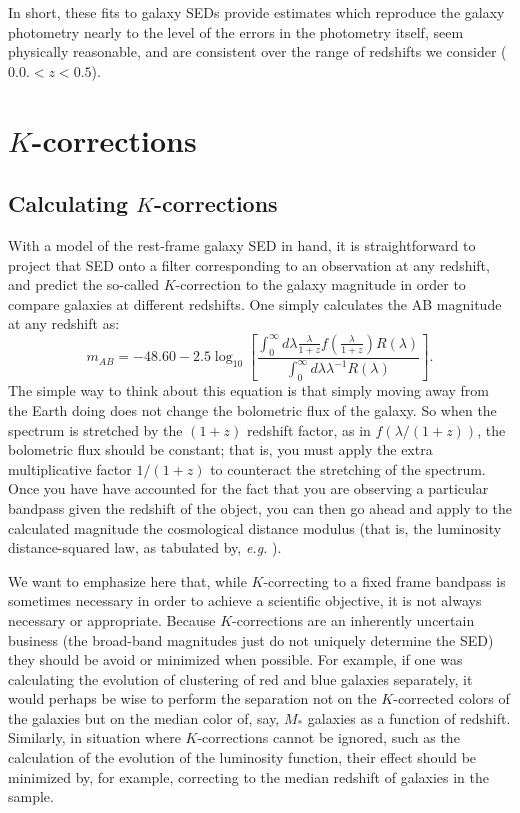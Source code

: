 \documentclass[10pt,preprint]{aastex}
\begin{document}
In short, these fits to galaxy SEDs provide estimates which reproduce
the galaxy photometry nearly to the level of the errors in the
photometry itself, seem physically reasonable, and are consistent over
the range of redshifts we consider ($0.0. < z < 0.5$).

\section{$K$-corrections}
\label{kcorrection}

\subsection{Calculating $K$-corrections}

With a model of the rest-frame galaxy SED in hand, it is 
straightforward to project that SED onto a filter corresponding to 
an observation at any redshift, and predict the so-called
$K$-correction to the galaxy magnitude in order to compare galaxies 
at different redshifts. One simply calculates the AB magnitude at 
any redshift as:
\begin{equation}
m_{AB} = -48.60 - 2.5 \log_{10}\left[
\frac{\int_{0}^{\infty} d\lambda \frac{\lambda}{1+z}
f(\frac{\lambda}{1+z}) R(\lambda)}
{\int_{0}^{\infty} d\lambda \lambda^{-1} R(\lambda)}\right].
\end{equation}
The simple way to think about this equation is that simply moving away
from the Earth doing does not change the bolometric flux of the
galaxy. So when the spectrum is stretched by the $(1+z)$ redshift
factor, as in $f(\lambda/(1+z))$, the bolometric flux should be
constant; that is, you must apply the extra multiplicative factor
$1/(1+z)$ to counteract the stretching of the spectrum. Once you have
have accounted for the fact that you are observing a particular
bandpass given the redshift of the object, you can then go ahead and
apply to the calculated magnitude the cosmological distance modulus
(that is, the luminosity distance-squared law, as tabulated by, {\it
e.g.} \citealt{hogg97a}).

We want to emphasize here that, while $K$-correcting to a fixed frame
bandpass is sometimes necessary in order to achieve a scientific
objective, it is not always necessary or appropriate. Because
$K$-corrections are an inherently uncertain business (the broad-band
magnitudes just do not uniquely determine the SED) they should be
avoid or minimized when possible. For example, if one was calculating
the evolution of clustering of red and blue galaxies separately, it
would perhaps be wise to perform the separation not on the
$K$-corrected colors of the galaxies but on the median color of, say,
$M_\ast$ galaxies as a function of redshift. Similarly, in situation
where $K$-corrections cannot be ignored, such as the calculation of
the evolution of the luminosity function, their effect should be
minimized by, for example, correcting to the median redshift of
galaxies in the sample.
\end{document}
